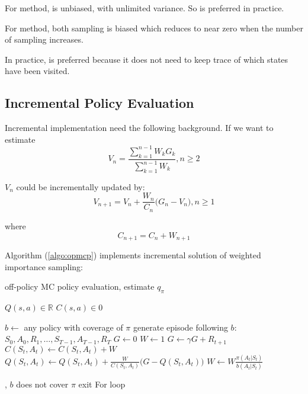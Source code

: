 For  method,  is unbiased, with unlimited variance. So  is preferred in practice.

For  method, both sampling is biased which reduces to near zero when the number of sampling increases.


In practice,  is preferred because it does not need to keep trace of which states have been visited.

\subsection{Incremental Policy Evaluation}

Incremental implementation need the following background. If we want to estimate 
\begin{equation}
	V_n = \frac{\sum\limits_{k=1}^{n-1} W_k G_k}{\sum\limits_{k=1}^{n-1} W_k}, n \geq 2
\end{equation}

$V_n$ could be incrementally updated by:
\begin{equation}
	V_{n+1} = V_n + \frac{W_n}{C_n} \Big( G_n - V_n \Big), n \geq 1
\end{equation}

where 
\begin{equation*}
	C_{n+1} = C_n + W_{n+1}
\end{equation*}

Algorithm (\ref{algo:opmcp}) implements incremental solution of weighted importance sampling:

\begin{algorithm}
	\caption{off-policy MC policy evaluation, estimate $q_\pi$}\label{algo:opmcp}	
	
	\begin{algorithmic}[1]
		\State $Q(s,a) \in \mathbb{R}$
		\State $C(s,a) \in 0$
		
		\Statex
		
		\Loop
			\State $b \gets $ any policy with coverage of $\pi$
			\State generate episode following $b$: $S_0, A_0,R_1, \dots, S_{T-1},A_{T-1},R_T$
			\State $G \gets 0$
			\State $W \gets 1$
				\State $G \gets \gamma G + R_{t+1}$
				\State $C(S_t,A_t) \gets C(S_t,A_t) + W$ 
				\State $Q(S_t,A_t) \gets Q(S_t,A_t) + \frac{W}{C(S_t,A_t)} \Big ( G - Q(S_t,A_t) \Big)$
				\State $W \gets W \frac{\pi(A_t|S_t)}{b(A_t|S_t)}$
				
				 , $b$ does not cover $\pi$
					\State exit  For loop
				\EndIf
			\EndFor
		\EndLoop
	\end{algorithmic}
\end{algorithm}


